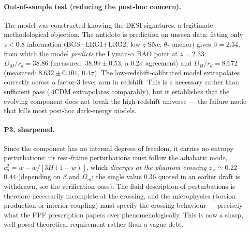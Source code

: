 \documentclass[11pt]{article}
\begin{document}
\paragraph{Out-of-sample test (reducing the post-hoc concern).} The model was constructed knowing the DESI signatures, a legitimate methodological objection. The antidote is prediction on unseen data: fitting only $z < 0.8$ information (BGS+LRG1+LRG2, low-$z$ SNe, $\theta_*$ anchor) gives $\beta = 2.34$, from which the model \emph{predicts} the Lyman-$\alpha$ BAO point at $z = 2.33$: $D_M/r_d = 38.86$ (measured: $38.99 \pm 0.53$, a $0.2\sigma$ agreement) and $D_H/r_d = 8.672$ (measured: $8.632 \pm 0.101$, $0.4\sigma$). The low-redshift-calibrated model extrapolates correctly across a factor-3 lever arm in redshift. This is a necessary rather than sufficient pass ($\Lambda$CDM extrapolates comparably), but it establishes that the evolving component does not break the high-redshift universe --- the failure mode that kills most post-hoc dark-energy models.

\paragraph{P3, sharpened.} Since the component has no internal degrees of freedom, it carries no entropy perturbations: its rest-frame perturbations must follow the adiabatic mode, $c_a^2 = w - \dot w/[3H(1+w)]$, which \emph{diverges at the phantom crossing} $z_\times \simeq 0.22$--$0.44$ (depending on $\beta$ and $\Omega_m$; the single value $0.36$ quoted in an earlier draft is withdrawn, see the verification pass). The fluid description of perturbations is therefore necessarily incomplete at the crossing, and the microphysics (torsion production or interior coupling) must specify the crossing behaviour --- precisely what the PPF prescription papers over phenomenologically. This is now a sharp, well-posed theoretical requirement rather than a vague debt.
\end{document}
